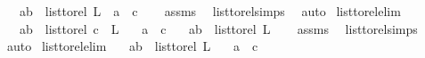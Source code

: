 \begin{isabellebody}
\ \ \ {\isachardoublequoteopen}{\isacharparenleft}{\kern0pt}a{\isacharcomma}{\kern0pt}b{\isacharparenright}{\kern0pt}\ {\isasymin}\ list{\isacharunderscore}{\kern0pt}to{\isacharunderscore}{\kern0pt}rel\ {\isacharparenleft}{\kern0pt}L{\isacharparenright}{\kern0pt}\ {\isasymor}\ a\ {\isacharequal}{\kern0pt}\ c{\isachardoublequoteclose}\isanewline
%
\isadelimproof
\ \ %
\endisadelimproof
%
\isatagproof
{}\isamarkupfalse%
\ assms\ \isamarkupfalse%
\ list{\isacharunderscore}{\kern0pt}to{\isacharunderscore}{\kern0pt}rel{\isachardot}{\kern0pt}simps\ \isamarkupfalse%
\ auto%
\endisatagproof
{\isafoldproof}%
%
\isadelimproof
\isanewline
%
\endisadelimproof
\isanewline
{}\isamarkupfalse%
\ list{\isacharunderscore}{\kern0pt}to{\isacharunderscore}{\kern0pt}rel{\isacharunderscore}{\kern0pt}elim{\isacharcolon}{\kern0pt}\isanewline
\ \ \ {\isachardoublequoteopen}{\isacharparenleft}{\kern0pt}a{\isacharcomma}{\kern0pt}b{\isacharparenright}{\kern0pt}\ {\isasymin}\ list{\isacharunderscore}{\kern0pt}to{\isacharunderscore}{\kern0pt}rel\ {\isacharparenleft}{\kern0pt}c\ {\isacharhash}{\kern0pt}\ L{\isacharparenright}{\kern0pt}{\isachardoublequoteclose}\isanewline
\ \ \ {\isachardoublequoteopen}a\ {\isasymnoteq}\ c{\isachardoublequoteclose}\isanewline
\ \ \ {\isachardoublequoteopen}{\isacharparenleft}{\kern0pt}a{\isacharcomma}{\kern0pt}b{\isacharparenright}{\kern0pt}\ {\isasymin}\ list{\isacharunderscore}{\kern0pt}to{\isacharunderscore}{\kern0pt}rel\ {\isacharparenleft}{\kern0pt}L{\isacharparenright}{\kern0pt}{\isachardoublequoteclose}\isanewline
%
\isadelimproof
\ \ %
\endisadelimproof
%
\isatagproof
{}\isamarkupfalse%
\ assms\ \isamarkupfalse%
\ list{\isacharunderscore}{\kern0pt}to{\isacharunderscore}{\kern0pt}rel{\isachardot}{\kern0pt}simps\ \isamarkupfalse%
\ auto%
\endisatagproof
{\isafoldproof}%
%
\isadelimproof
\isanewline
%
\endisadelimproof
\isanewline
{}\isamarkupfalse%
\ list{\isacharunderscore}{\kern0pt}to{\isacharunderscore}{\kern0pt}rel{\isacharunderscore}{\kern0pt}elim{}{\isacharcolon}{\kern0pt}\isanewline
\ \ \ {\isachardoublequoteopen}{\isacharparenleft}{\kern0pt}a{\isacharcomma}{\kern0pt}b{\isacharparenright}{\kern0pt}\ {\isasymnotin}\ list{\isacharunderscore}{\kern0pt}to{\isacharunderscore}{\kern0pt}rel\ {\isacharparenleft}{\kern0pt}L{\isacharparenright}{\kern0pt}{\isachardoublequoteclose}\isanewline
\ \ \ {\isachardoublequoteopen}a\ {\isasymnoteq}\ c{\isachardoublequoteclose}\isanewline

\end{isabellebody}
